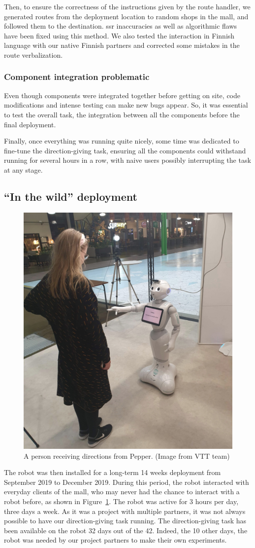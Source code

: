 \documentclass[a4paper,11pt,twoside]{StyleThese}
\begin{document}
Then, to ensure the correctness of the instructions given by the route handler, we generated routes from the deployment location to random shops in the mall, and followed them to the destination. \acrshort{ssr} inaccuracies as well as algorithmic flaws have been fixed using this method. We also tested the interaction in Finnish language with our native Finnish partners and corrected some mistakes in the route verbalization.


\subsubsection{Component integration problematic}
Even though components were integrated together before getting on site, code modifications and intense testing can make new bugs appear. So, it was essential to test the overall task, \ie the integration between all the components before the final deployment.

Finally, once everything was running quite nicely, some time was dedicated to fine-tune the direction-giving task, ensuring all the components could withstand running for several hours in a row, with naive users possibly interrupting the task at any stage. 

\subsection{``In the wild'' deployment}\label{subsec:deploy}
\begin{figure}
	\centering
	\includegraphics[width=0.5\linewidth]{figures/chapter3/guided_person.jpg}
	\caption{A person receiving directions from Pepper. (Image from VTT team)}
	\label{fig:guided_person}
\end{figure}
The robot was then installed for a long-term 14 weeks deployment from September 2019 to December 2019. During this period, the robot interacted with everyday clients of the mall, who may never had the chance to interact with a robot before, as shown in Figure~\ref{fig:guided_person}. The robot was active for 3 hours per day, three days a week. As it was a project with multiple partners, it was not always possible to have our direction-giving task running. The direction-giving task has been available on the robot 32 days out of the 42. Indeed, the 10 other days, the robot was needed by our project partners to make their own experiments. 
\end{document}
